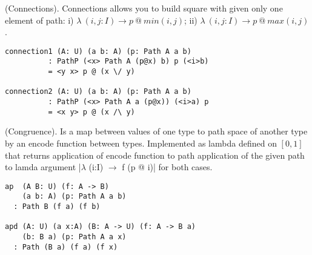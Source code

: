 \begin{definition} (Connections).
Connections allows you to build square
with given only one element of path: i) $\lambda\ (i,j: I) \rightarrow p\ @\ min(i,j)$;
ii) $\lambda\ (i,j:I) \rightarrow p\ @\ max(i,j)$.
\begin{center}
\end{center}
\begin{lstlisting}
connection1 (A: U) (a b: A) (p: Path A a b)
          : PathP (<x> Path A (p@x) b) p (<i>b)
          = <y x> p @ (x \/ y)

connection2 (A: U) (a b: A) (p: Path A a b)
          : PathP (<x> Path A a (p@x)) (<i>a) p
          = <x y> p @ (x /\ y)
\end{lstlisting}
\end{definition}

\begin{theorem} (Congruence).
Is a map between values of one type
to path space of another type by an encode function between types.
Implemented as lambda defined on $[0,1]$ that returns
application of encode function to path application of
the given path to lamda argument |$\lambda$ (i:I) $\rightarrow$ f (p @ i)|
for both cases.
\begin{lstlisting}
ap  (A B: U) (f: A -> B)
    (a b: A) (p: Path A a b)
  : Path B (f a) (f b)

apd (A: U) (a x:A) (B: A -> U) (f: A -> B a)
    (b: B a) (p: Path A a x)
  : Path (B a) (f a) (f x)
\end{lstlisting}
\end{theorem}

